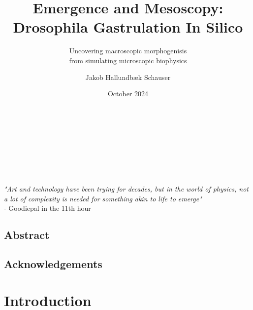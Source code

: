 \documentclass[12pt, oneside]{book}
\author{Jakob Hallundbæk Schauser}
\title{Emergence and Mesoscopy:\\ Drosophila Gastrulation In Silico}
\subtitle{Uncovering macroscopic morphogenisis\\ from simulating microscopic biophysics}
\date{October 2024}
\renewcommand{\headrulewidth}{0pt}
\newcommand\mymainpagestyle{%
\fancyhf{}      
\fancyhead[L]{\nouppercase{\footnotesize{\chaptername~ \thechapter~ |~ \leftmark}} \renewcommand{\headrulewidth}{0.4pt} \headrule \renewcommand{\headrulewidth}{0pt}}
\setlength{\headheight}{25pt}
\fancyfoot[C]{\thepage}
}
\begin{document}


\maketitle
\frontmatter %
\pagestyle{plain} %

\newpage \ \\\\\\\\\\\\\textit{"Art and technology have been trying for decades, but in the world of physics, not a lot of complexity is needed for something akin to life to emerge"} \\- Goodiepal in the 11th hour%

\section*{Abstract}
\label{sec:abstract}


\newpage
\section*{Acknowledgements}
\label{sec:acks}


\newpage
\tableofcontents
\newpage


\mainmatter 
\mymainpagestyle{} %

\chapter{Introduction}
\label{chap:intro}

\end{document}

